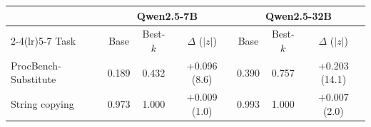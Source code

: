 \begin{tabular}{lcccccc}
\toprule
& \multicolumn{3}{c}{Qwen2.5-7B} & \multicolumn{3}{c}{Qwen2.5-32B} \\
\cmidrule(lr){2-4}\cmidrule(lr){5-7}
Task & Base & Best-$k$ & $\Delta$ ($|z|$) & Base & Best-$k$ & $\Delta$ ($|z|$) \\
\midrule
ProcBench-Substitute & 0.189 & 0.432 & +0.096 (8.6) & 0.390 & 0.757 & +0.203 (14.1) \\
String copying & 0.973 & 1.000 & +0.009 (1.0) & 0.993 & 1.000 & +0.007 (2.0) \\
\bottomrule
\end{tabular}
